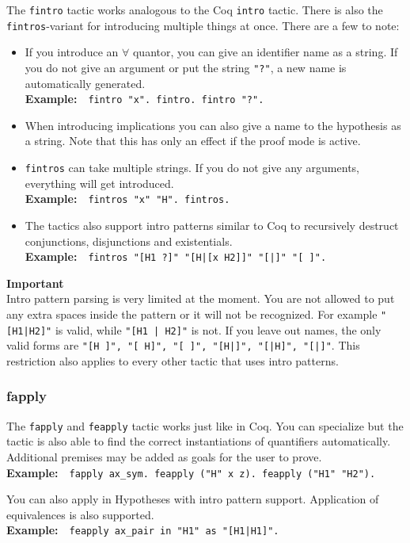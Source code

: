 \documentclass[12pt, a4paper]{article}
\newcommand{\coq}[1]{\texttt{#1}}
\newcommand{\important}[1]{
	\vspace{3pt}
	\begin{boximportant}
		\parbox{\textwidth}{\textcolor{colorimportant}{\textbf{Important}\\#1}}
	\end{boximportant}}
\newcommand{\example}[1]{\medskip\\\textbf{Example:}~~#1}
\begin{document}
The \texttt{fintro} tactic works analogous to the Coq \texttt{intro} tactic. 
There is also the \texttt{fintros}-variant for introducing multiple things at once. 
There are a few  to note:
\begin{itemize}
	\item 
	If you introduce an $\forall$ quantor, you can give an identifier name as a string. 
	If you do not give an argument or put the string \coq{"?"}, a new name is automatically generated.
	\example{\coq{fintro "x". fintro. fintro "?".}}
	
	\item
	When introducing implications you can also give a name to the hypothesis as a string. 
	Note that this has only an effect if the proof mode is active.
	
	\item 
	\texttt{fintros} can take multiple strings. 
	If you do not give any arguments, everything will get introduced.
	\example{\coq{fintros "x" "H". fintros.}}
	
	\item
	The tactics also support intro patterns similar to Coq to recursively destruct conjunctions, disjunctions and existentials.
	\example{\coq{fintros "[H1 ?]" "[H|[x H2]]" "[|]" "[ ]".}}
\end{itemize}
\label{todo-intro-pattern-parsing}\important{Intro pattern parsing is very limited at the moment. You are not allowed to put any extra spaces inside the pattern or it will not be recognized. For example \texttt{"[H1|H2]"} is valid, while \texttt{"[H1 | H2]"} is not. If you leave out names, the only valid forms are \texttt{"[H ]", "[ H]", "[ ]", "[H|]", "[|H]", "[|]"}. This restriction also applies to every other tactic that uses intro patterns.}



\subsubsection{\ttfamily fapply}

The \texttt{fapply} and \texttt{feapply} tactic works just like in Coq. 
You can specialize but the tactic is also able to find the correct instantiations of quantifiers automatically. Additional premises may be added as goals for the user to prove.
\example{\coq{fapply ax_sym. feapply ("H" x z). feapply ("H1" "H2").}}

\medskip\noindent
You can also apply in Hypotheses with intro pattern support. Application of equivalences is also supported.
\example{\coq{feapply ax_pair in "H1" as "[H1|H1]".}}
\end{document}
